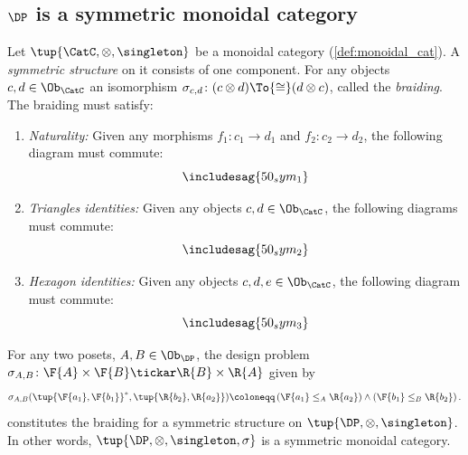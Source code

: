 \subsection{$\DP$ is a symmetric monoidal category}
\begin{shaded}
\begin{definition}
Let $\tup{\CatC,\otimes,\singleton}$ be a monoidal category (\cref{def:monoidal_cat}). A \emph{symmetric structure} on it consists of one component. For any objects $c,d\in\Ob_\CatC$ an isomorphism $\sigma_{c,d}\colon (c\otimes d)\To{\cong}(d\otimes c)$, called the \emph{braiding}. The braiding must satisfy:
\begin{enumerate}
	\item \emph{Naturality:} Given any morphisms $f_1\colon c_1\to d_1$ and $f_2\colon c_2\to d_2$, the following diagram must commute:
	\begin{equation}
	\includesag{50_sym_1}
	\end{equation}
	\item \emph{Triangles identities:} Given any objects $c,d\in\Ob_\CatC$, the following diagrams must commute:
\begin{equation}
	\includesag{50_sym_2}
\end{equation}
\item \emph{Hexagon identities:} Given any objects $c,d,e\in \Ob_\CatC$, the following diagram must commute:
\begin{equation}
    \includesag{50_sym_3}
\end{equation}
\end{enumerate}
\end{definition}
\end{shaded}

\begin{lemma}
\label{lemma:symmetricmonoidaldp}
For any two posets, $A,B \in\Ob_\DP$, the design problem $\sigma_{A,B}\colon \F{A} \times \F{B} \tickar \R{B} \times \R{A} $ given by
\begin{equation}
        \sigma_{A,B}(\tup{\F{a_1},\F{b_1}}^*,\tup{\R{b_2},\R{a_2}})\coloneqq \left(\F{a_1}\leq_A \R{a_2}\right)\wedge \left(\F{b_1}\leq_B \R{b_2}\right).
\end{equation}
constitutes the braiding for a symmetric structure on $\tup{\DP,\otimes,\singleton}$. In other words, $\tup{\DP, \otimes, \singleton, \sigma}$ is a symmetric monoidal category.
\end{lemma}


